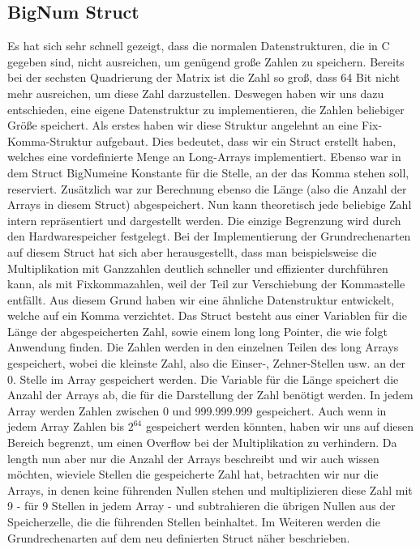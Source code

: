 \documentclass[course=erap]{aspdoc}
\begin{document}
    \subsection{BigNum Struct}
    Es hat sich sehr schnell gezeigt, dass die normalen Datenstrukturen, die in C gegeben sind, nicht ausreichen, um genügend große Zahlen zu speichern. Bereits bei der sechsten Quadrierung der Matrix ist die Zahl so groß, dass 64 Bit nicht mehr ausreichen, um diese Zahl darzustellen. Deswegen haben wir uns dazu entschieden, eine eigene Datenstruktur zu implementieren, die Zahlen beliebiger Größe speichert. Als erstes haben wir diese Struktur angelehnt an eine Fix-Komma-Struktur aufgebaut. Dies bedeutet, dass wir ein Struct erstellt haben, welches eine vordefinierte Menge an Long-Arrays implementiert. Ebenso war in dem Struct \glqq BigNum\grqq eine Konstante für die Stelle, an der das Komma stehen soll, reserviert. Zusätzlich war zur Berechnung ebenso die Länge (also die Anzahl der Arrays in diesem Struct) abgespeichert. Nun kann theoretisch jede beliebige Zahl intern repräsentiert und dargestellt werden. Die einzige Begrenzung wird durch den Hardwarespeicher festgelegt.
    Bei der Implementierung der Grundrechenarten auf diesem Struct hat sich aber herausgestellt, dass man beispielsweise die Multiplikation mit Ganzzahlen deutlich schneller und effizienter durchführen kann, als mit Fixkommazahlen, weil der Teil zur Verschiebung der Kommastelle entfällt. Aus diesem Grund haben wir eine ähnliche Datenstruktur entwickelt, welche auf ein Komma verzichtet. Das Struct besteht aus einer Variablen für die Länge der abgespeicherten Zahl, sowie einem long long Pointer, die wie folgt Anwendung finden. Die Zahlen werden in den einzelnen Teilen des long Arrays gespeichert, wobei die kleinste Zahl, also die Einser-, Zehner-Stellen usw. an der 0. Stelle im Array gespeichert werden. Die Variable für die Länge speichert die Anzahl der Arrays ab, die für die Darstellung der Zahl benötigt werden. In jedem Array werden Zahlen zwischen 0 und 999.999.999 gespeichert.
    Auch wenn in jedem Array Zahlen bis \begin{math}
                                            2^{64}
    \end{math} gespeichert werden könnten, haben wir uns auf diesen Bereich begrenzt, um einen Overflow bei der Multiplikation zu verhindern. Da length nun aber nur die Anzahl der Arrays beschreibt und wir auch wissen möchten, wieviele Stellen die gespeicherte Zahl hat, betrachten wir nur die Arrays, in denen keine führenden Nullen stehen und multiplizieren diese Zahl mit 9 - für 9 Stellen in jedem Array - und subtrahieren die übrigen Nullen aus der Speicherzelle, die die führenden Stellen beinhaltet. Im Weiteren werden die Grundrechenarten auf dem neu definierten Struct näher beschrieben.
\end{document}
